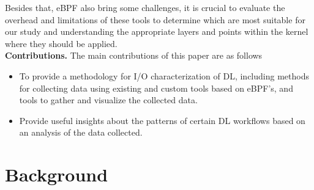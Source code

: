 \documentclass[conference]{IEEEtran}
\begin{document}
Besides that, eBPF also bring some challenges, it is crucial to evaluate the overhead and limitations of these tools to determine which are most suitable for our study and understanding the appropriate layers and points within the kernel where they should be applied.\\
\textbf{Contributions.} The main contributions of this paper are as follows
\begin{itemize}
	\item To provide a methodology for I/O characterization of DL, including methods for collecting data using existing and custom tools based on eBPF's, and tools to gather and visualize the collected data.
	\item Provide useful insights about the patterns of certain DL workflows based on an analysis of the data collected.
\end{itemize}


\section{Background}
\end{document}
